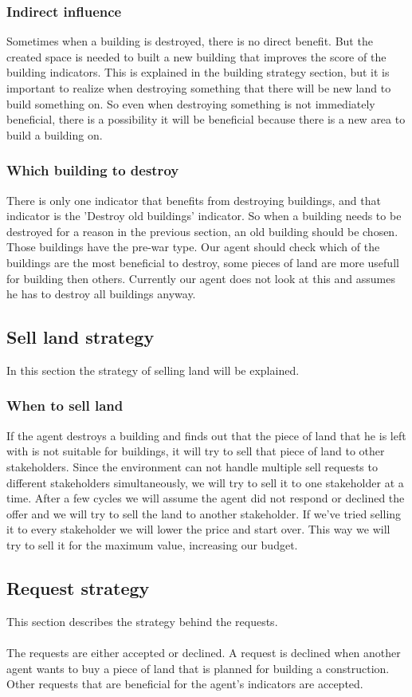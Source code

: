 \subsubsection{Indirect influence}
Sometimes when a building is destroyed, there is no direct benefit. But the created space is needed to built a new building that improves the score of the building indicators. This is explained in the building strategy section, but it is important to realize when destroying something that there will be new land to build something on. So even when destroying something is not immediately beneficial, there is a possibility it will be beneficial because there is a new area to build a building on.

\subsubsection{Which building to destroy}
There is only one indicator that benefits from destroying buildings, and that indicator is the 'Destroy old buildings' indicator. So when a building needs to be destroyed for a reason in the previous section, an old building should be chosen. Those buildings have the pre-war type. Our agent should check which of the buildings are the most beneficial to destroy, some pieces of land are more usefull for building then others. Currently our agent does not look at this and assumes he has to destroy all buildings anyway. 

\subsection{Sell land strategy}
In this section the strategy of selling land will be explained. 

\subsubsection{When to sell land}
If the agent destroys a building and finds out that the piece of land that he is left with is not suitable for buildings, it will try to sell that piece of land to other stakeholders. Since the environment can not handle multiple sell requests to different stakeholders simultaneously, we will try to sell it to one stakeholder at a time. After a few cycles we will assume the agent did not respond or declined the offer and we will try to sell the land to another stakeholder. If we've tried selling it to every stakeholder we will lower the price and start over. This way we will try to sell it for the maximum value, increasing our budget.

\subsection{Request strategy}
This section describes the strategy behind the requests.
\\\\
The requests are either accepted or declined. A request is declined when another agent wants to buy a piece of land that is planned for building a construction. Other requests that are beneficial for the agent’s indicators are accepted.


